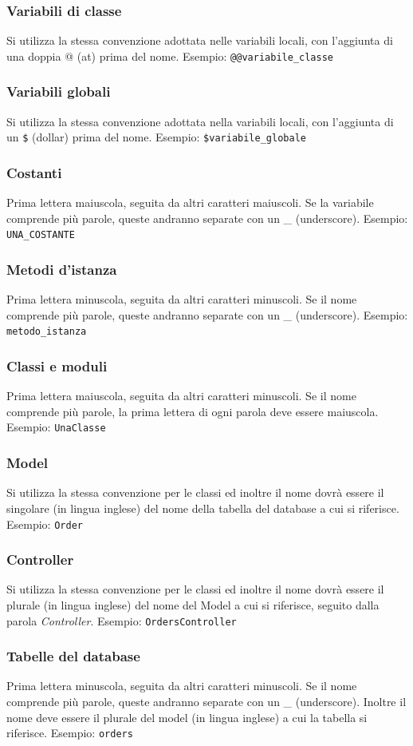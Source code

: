 \documentclass[11pt,a4paper]{article}
\begin{document}
\subsubsection*{Variabili di classe}
Si utilizza la stessa convenzione adottata nelle variabili locali, con l'aggiunta di una doppia @ (at) prima del nome. Esempio: \verb|@@variabile_classe|
\subsubsection*{Variabili globali}
Si utilizza la stessa convenzione adottata nella variabili locali, con l'aggiunta di un \verb|$| (dollar) prima del nome. Esempio: \verb|$variabile_globale|
\subsubsection*{Costanti}
Prima lettera maiuscola, seguita da altri caratteri maiuscoli. Se la variabile comprende più parole, queste andranno separate con un \_ (underscore). Esempio: \verb|UNA_COSTANTE|
\subsubsection*{Metodi d'istanza}
Prima lettera minuscola, seguita da altri caratteri minuscoli. Se il nome comprende più parole, queste andranno separate con un \_ (underscore). Esempio: \verb|metodo_istanza|
\subsubsection*{Classi e moduli}
Prima lettera maiuscola, seguita da altri caratteri minuscoli. Se il nome comprende più parole, la prima lettera di ogni parola deve essere maiuscola. Esempio: \verb|UnaClasse|
\subsubsection*{Model}
Si utilizza la stessa convenzione per le classi ed inoltre il nome dovrà essere il singolare (in lingua inglese) del nome della tabella del database a cui si riferisce. Esempio: \verb|Order|
\subsubsection*{Controller}
Si utilizza la stessa convenzione per le classi ed inoltre il nome dovrà essere il plurale (in lingua inglese) del nome del Model a cui si riferisce, seguito dalla parola \textit{Controller}. Esempio: \verb|OrdersController|
\subsubsection*{Tabelle del database}
Prima lettera minuscola, seguita da altri caratteri minuscoli. Se il nome comprende più parole, queste andranno separate con un \_ (underscore). Inoltre il nome deve essere il plurale del model (in lingua inglese) a cui la tabella si riferisce. Esempio: \verb|orders|
\end{document}
